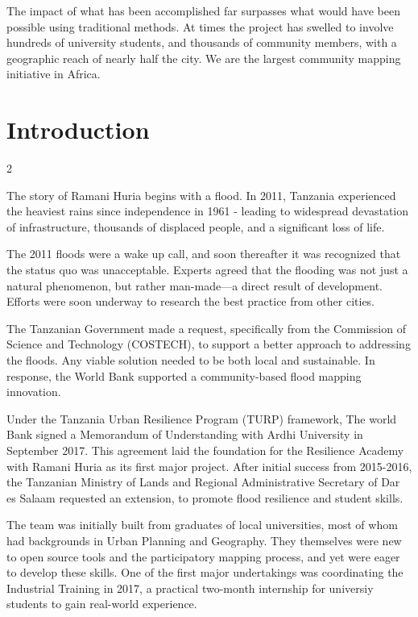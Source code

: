 \documentclass[a4paper,12pt,twoside]{article}
\begin{document}
The impact of what has been accomplished far surpasses what would have been possible using traditional methods. At times the project has swelled to involve hundreds of university students, and thousands of community members, with a geographic reach of nearly half the city. We are  the largest community mapping initiative in Africa. 



\newpage
\section{Introduction}
\label{Introduction}
\begin{multicols} {2}

The story of Ramani Huria begins with a flood. In 2011, Tanzania experienced the heaviest rains since independence in 1961 - leading to widespread devastation of infrastructure, thousands of displaced people, and a significant loss of life. 

The 2011 floods were a wake up call, and soon thereafter it was recognized that the status quo was unacceptable. Experts agreed that the flooding was not just a natural phenomenon, but rather man-made—a direct result of development. Efforts were soon underway to research the best practice from other cities. 

The Tanzanian Government made a request, specifically from the Commission of Science and Technology (COSTECH), to support a better approach to addressing the floods. Any viable solution needed to be both local and sustainable. In response, the World Bank supported a community-based flood mapping innovation.

Under the Tanzania Urban Resilience Program (TURP)  framework, The world Bank  signed a Memorandum of Understanding with Ardhi University in September 2017. This agreement laid the foundation for the Resilience Academy with Ramani Huria as its first major project. After initial success from 2015-2016, the Tanzanian Ministry of Lands and Regional Administrative Secretary of Dar es Salaam requested an extension, to promote flood resilience and student skills. 

The team was initially built from graduates of local universities, most of whom had backgrounds in Urban Planning and Geography. They themselves were new to open source tools and the participatory mapping process, and yet were eager to develop these skills. One of the first major undertakings was coordinating the Industrial Training in 2017, a practical two-month internship for universiy students to gain real-world experience. 


\end{multicols}
\end{document}
